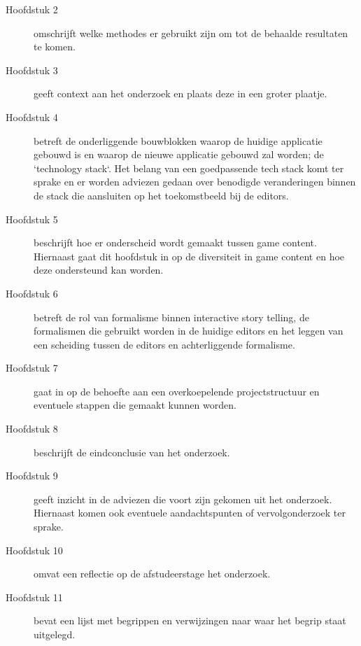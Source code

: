\begin{description}
    \item[Hoofdstuk 2] omschrijft welke methodes er gebruikt zijn om tot de behaalde resultaten te komen.
    \item[Hoofdstuk 3] geeft context aan het onderzoek en plaats deze in een groter plaatje.
    \item[Hoofdstuk 4] betreft de onderliggende bouwblokken waarop de huidige applicatie gebouwd is en waarop de nieuwe applicatie gebouwd zal worden; de ‘technology stack‘. Het belang van een goedpassende tech stack komt ter sprake en er worden adviezen gedaan over benodigde veranderingen binnen de stack die aansluiten op het toekomstbeeld bij de editors.
    \item[Hoofdstuk 5] beschrijft hoe er onderscheid wordt gemaakt tussen game content. Hiernaast gaat dit hoofdstuk in op de diversiteit in game content en hoe deze ondersteund kan worden.  
    \item[Hoofdstuk 6] betreft de rol van formalisme binnen interactive story telling, de formalismen die gebruikt worden in de huidige editors en het leggen van een scheiding tussen de editors en achterliggende formalisme.
    \item[Hoofdstuk 7] gaat in op de behoefte aan een overkoepelende projectstructuur en eventuele stappen die gemaakt kunnen worden.
    \item[Hoofdstuk 8] beschrijft de eindconclusie van het onderzoek.
    \item[Hoofdstuk 9] geeft inzicht in de adviezen die voort zijn gekomen uit het onderzoek. Hiernaast komen ook eventuele aandachtspunten of vervolgonderzoek ter sprake.
    \item[Hoofdstuk 10] omvat een reflectie op de afstudeerstage het onderzoek.
    \item[Hoofdstuk 11] bevat een lijst met begrippen en verwijzingen naar waar het begrip staat uitgelegd.
\end{description}